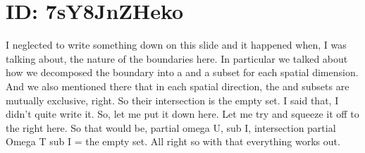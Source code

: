 \documentclass[10pt]{article}
\begin{document}
\section*{ID: 7sY8JnZHeko}
I neglected to write something down on this slide and it happened when, I was talking about, the nature of the boundaries here. In particular we talked about how we decomposed the boundary into a and a subset for each spatial dimension. And we also mentioned there that in each spatial direction, the and subsets are mutually exclusive, right. So their intersection is the empty set. I said that, I didn't quite write it. So, let me put it down here. Let me try and squeeze it off to the right here. So that would be, partial omega U, sub I, intersection partial Omega T sub I = the empty set. All right so with that everything works out.
\end{document}
